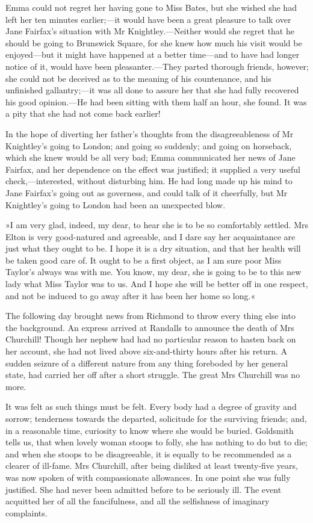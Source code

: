 Emma could not regret her having gone to Miss Bates, but she wished she had left her ten minutes earlier;—it would have been a great pleasure to talk over Jane Fairfax's situation with Mr Knightley.—Neither would she regret that he should be going to Brunswick Square, for she knew how much his visit would be enjoyed—but it might have happened at a better time—and to have had longer notice of it, would have been pleasanter.—They parted thorough friends, however; she could not be deceived as to the meaning of his countenance, and his unfinished gallantry;—it was all done to assure her that she had fully recovered his good opinion.—He had been sitting with them half an hour, she found. It was a pity that she had not come back earlier!

In the hope of diverting her father's thoughts from the disagreeableness of Mr Knightley's going to London; and going so suddenly; and going on horseback, which she knew would be all very bad; Emma communicated her news of Jane Fairfax, and her dependence on the effect was justified; it supplied a very useful check,—interested, without disturbing him. He had long made up his mind to Jane Fairfax's going out as governess, and could talk of it cheerfully, but Mr Knightley's going to London had been an unexpected blow.

»I am very glad, indeed, my dear, to hear she is to be so comfortably settled. Mrs Elton is very good-natured and agreeable, and I dare say her acquaintance are just what they ought to be. I hope it is a dry situation, and that her health will be taken good care of. It ought to be a first object, as I am sure poor Miss Taylor's always was with me. You know, my dear, she is going to be to this new lady what Miss Taylor was to us. And I hope she will be better off in one respect, and not be induced to go away after it has been her home so long.«

The following day brought news from Richmond to throw every thing else into the background. An express arrived at Randalls to announce the death of Mrs Churchill! Though her nephew had had no particular reason to hasten back on her account, she had not lived above six-and-thirty hours after his return. A sudden seizure of a different nature from any thing foreboded by her general state, had carried her off after a short struggle. The great Mrs Churchill was no more.

It was felt as such things must be felt. Every body had a degree of gravity and sorrow; tenderness towards the departed, solicitude for the surviving friends; and, in a reasonable time, curiosity to know where she would be buried. Goldsmith tells us, that when lovely woman stoops to folly, she has nothing to do but to die; and when she stoops to be disagreeable, it is equally to be recommended as a clearer of ill-fame. Mrs Churchill, after being disliked at least twenty-five years, was now spoken of with compassionate allowances. In one point she was fully justified. She had never been admitted before to be seriously ill. The event acquitted her of all the fancifulness, and all the selfishness of imaginary complaints.

